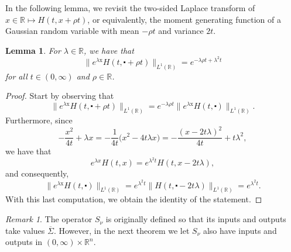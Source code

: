 \documentclass[10pt,a4paper]{amsart}
\newtheorem{lemma}[proposition]{Lemma}
\theoremstyle{remark}
\newtheorem{remark}[proposition]{Remark}
\theoremstyle{definition}
\newcommand{\R}{\mathbb{R}}
\newcommand{\x}{\mathrm{x}}
\begin{document}
In the following lemma, we revisit the two-sided Laplace transform of 
$x \in \R \mapsto H(t, x + \rho t)$, or equivalently, 
the moment generating function of a Gaussian random variable
with mean $-\rho t$ and variance $2t$.
\begin{lemma}\label{lem:heat-exponential}\sl
For $\lambda \in \R$, we have that
\[ \| e^{\lambda \x} H(t, \centerdot + \rho t) \|_{L^1(\R)} = e^{-\lambda\rho t + \lambda^2 t} \]
for all $t \in (0, \infty)$ and $\rho \in \R$.
\end{lemma}

\begin{proof}
Start by observing that
\[ \| e^{\lambda \x} H(t, \centerdot + \rho t) \|_{L^1(\R)} = e^{- \lambda \rho t} \| e^{\lambda \x} H(t, \centerdot) \|_{L^1(\R)}. \]
Furthermore, since
\[-\frac{x^2}{4t} + \lambda x = - \frac{1}{4t} \Big( x^2 - 4t \lambda x \Big) = - \frac{(x-2t\lambda)^2}{4t} + t \lambda^2, \]
we have that
\[ e^{\lambda x} H(t, x) = e^{\lambda^2t} H(t, x - 2t\lambda), \]
and consequently,
\[ \| e^{\lambda \x} H(t, \centerdot) \|_{L^1(\R)} = e^{\lambda^2t} \| H(t, \centerdot - 2t\lambda) \|_{L^1(\R)} = e^{\lambda^2t}. \]
With this last computation, we obtain the identity of the statement.
\end{proof}

\begin{remark} The operator $S_\nu$ is originally defined so that its inputs and outputs take values $\overline{\Sigma}$. However, in the next theorem we let $S_\nu$ also have
inputs and outputs in $(0, \infty) \times \R^n$.
\end{remark}
\end{document}
